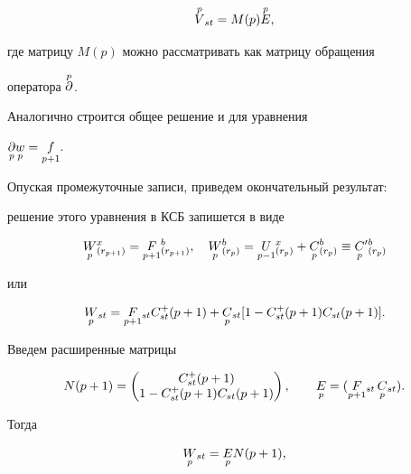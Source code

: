 \begin{equation} 


\up{p}{V}_{st}=M(p)\up{p}{E}, 


\end{equation} 


где матрицу $M(p)$ можно рассматривать как матрицу обращения 


оператора $\overset{p}{\partial}{}$. 


 


Аналогично строится общее решение и для уравнения 


$\underset{p}{\partial}{}\underset{p}{w}{}=\underset{p+1}{f}{}$. 


Опуская промежуточные записи, приведем окончательный результат: 


решение этого уравнения в КСБ запишется в виде 


$$ 


\down{p}{W}{}^x_{(r_{p+1})}=\down{p+1}{F}{}^b_{(r_{p+1})},\quad 


\down{p}{W}{}^b_{(r_p)}=\down{p-1}{U}{}^x_{(r_p)} 


+\down{p}{C}{}^b_{(r_p)}\equiv \down{p}{C}'{}^b_{(r_p)} 


$$ 


или 


\begin{equation} 


\down{p}{W}{}_{st}=\down{p+1}{F}{}_{st}C^+_{st}(p+1)+ 


\down{p}{C}{}_{st}[1-C^+_{st}(p+1)C_{st}(p+1)]. 


\end{equation} 


Введем расширенные матрицы 


$$ 


N(p+1)= 


\begin{pmatrix} 


C^+_{st}(p+1)\\ 


1-C^+_{st}(p+1)C_{st}(p+1) 


\end{pmatrix}, 


\qquad \down{p}{E}=(\down{p+1}{F}{}_{st}\,\down{p}{C}{}_{st}). 


$$ 


Тогда 


$$ 


\down{p}{W}{}_{st}=\down{p}{E}N(p+1), 


$$ 


